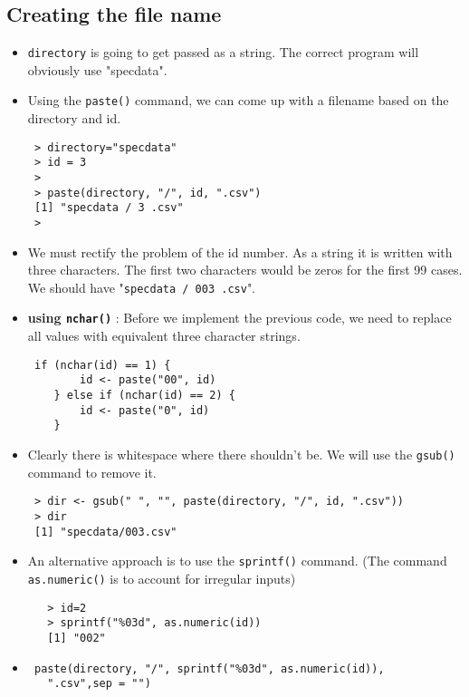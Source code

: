 \documentclass[]{article}
\begin{document}
 \subsection{Creating the file name}
 \begin{itemize}
  \item \texttt{directory} is going to get passed as a string. The correct program will obviously use "specdata".
  \item Using the \texttt{paste()} command, we can come up with a filename based on the directory and id.
 \begin{verbatim}
 > directory="specdata"
 > id = 3
 > 
 > paste(directory, "/", id, ".csv")
 [1] "specdata / 3 .csv"
 > 
 \end{verbatim}
  \item We must rectify the problem of the id number. As a string it is written with three characters. The first two characters would be zeros for the first 99 cases.
 We should have "\texttt{specdata / 003 .csv}".
 \item \textbf{using \texttt{nchar()}} : Before we implement the previous code, we need to replace all values with equivalent three character strings.
 \begin{verbatim}
 if (nchar(id) == 1) {
    	id <- paste("00", id)
    } else if (nchar(id) == 2) {
    	id <- paste("0", id)
    }
 \end{verbatim}

 \item Clearly there is whitespace where there shouldn't be. We will use the \texttt{gsub()} command to remove it. 
 \begin{verbatim}
 > dir <- gsub(" ", "", paste(directory, "/", id, ".csv"))
 > dir
 [1] "specdata/003.csv"
  \end{verbatim}
\newpage
   \item An alternative approach is to use the \texttt{sprintf()} command. (The command \texttt{as.numeric()} is to account for irregular inputs)
   \begin{verbatim}
   > id=2
   > sprintf("%03d", as.numeric(id))
   [1] "002"
   \end{verbatim}
   
 \item 
 \begin{framed}
 \begin{verbatim}
 paste(directory, "/", sprintf("%03d", as.numeric(id)),
   ".csv",sep = "")
 \end{verbatim}
 \end{framed}
 \end{itemize}
 \newpage
\end{document}
